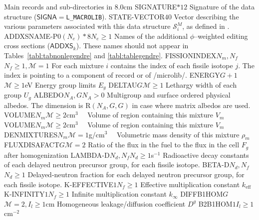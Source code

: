 \begin{DescriptionEnregistrement}{Main records and sub-directories in }{8.0cm}
\CharEnr
  {SIGNATURE}{$*12$}
  {Signature of the  data structure ($\mathsf{SIGNA}=${\tt L\_MACROLIB}).}
\IntEnr
  {STATE-VECTOR}{$40$}
  {Vector describing the various parameters associated with this data structure
  $\mathcal{S}^{M}_{i}$, as defined in .}
\OptCharEnr
  {ADDXSNAME-P0}{$(N_{e})*8$}{$N_{e} \ge 1$}
  {Names of the additional $\phi$--weighted editing cross sections ($\mathsf{ADDXS}_k$).
  These names should not appear in Tables~\ref{tabl:tabnonlegendre} and \ref{tabl:tablegendre}.}
\OptIntEnr
  {FISSIONINDEX}{$N_{m},N_{f}$}{$N_{f} \ge 1,\mathcal{M}=1$}
  {For each mixture $i$ contains the index of each fissile isotope $j$. The index is
   pointing to a component of record  or 
   of /microlib/.}
\OptRealEnr
  {ENERGY}{$G+1$}{$\mathcal{M}\ge 1$}{eV}
  {Energy group limits $E_{g}$}
\OptRealEnr
  {DELTAU}{$G$}{$\mathcal{M}\ge 1$}{}
  {Lethargy width of each group $U_{g}$}
\OptRealEnr
  {ALBEDO}{$N_{A}, G$}{$N_{A}> 0$}{}
  {Multigroup and surface ordered physical albedos. The dimension is R$(N_{A},G,G)$ in case where matrix albedos are used.}
\OptRealEnr
  {VOLUME}{$N_{m}$}{$\mathcal{M}\ge 2$}{cm$^{3}$~~}
  {Volume of region containing this mixture $V_{m}$}
\OptRealEnr
  {VOLUME}{$N_{m}$}{$\mathcal{M}\ge 2$}{cm$^{3}$~~}
  {Volume of region containing this mixture $V_{m}$}  
\OptRealEnr
  {DENMIXTURES}{$N_{m}$}{$\mathcal{M}=1$}{g/cm$^{3}$~~}
  {Volumetric mass density of this mixture $\rho_{m}$}  
\OptRealEnr
  {FLUXDISAFACT}{$G$}{$\mathcal{M}=2$}{}
  {Ratio of the flux in the fuel to the flux in the cell $F_{g}$ after homogenization}
\OptRealEnr
  {LAMBDA-D}{$N_{d},N_{f}$}{$N_{d}\ge 1$}{s$^{-1}$}
  {Radioactive decay constants of each delayed neutron precursor group, for each
  fissile isotope.}
\OptRealEnr
  {BETA-D}{$N_{d},N_{f}$}{$N_{d}\ge 1$}{}
  {Delayed-neutron fraction for each delayed neutron precursor group, for each
  fissile isotope.}
\OptRealEnr
  {K-EFFECTIVE}{$1$}{$N_{f} \ge 1$}{}
  {Effective multiplication constant $k_{\mathrm{eff}}$}
\OptRealEnr
  {K-INFINITY}{$1$}{$N_{f} \ge 1$}{}
  {Infinite multiplication constant $k_{\infty}$}
\OptRealEnr
  {DIFFB1HOM}{$G$}{$\mathcal{M}=2,I_{l} \ge 1$}{cm}
  {Homogeneous leakage/diffusion coefficient $D^{g}$}
\OptRealEnr
  {B2B1HOM}{$1$}{$I_{l} \ge 1$}{cm$^{-2}$~~}

\end{DescriptionEnregistrement}
